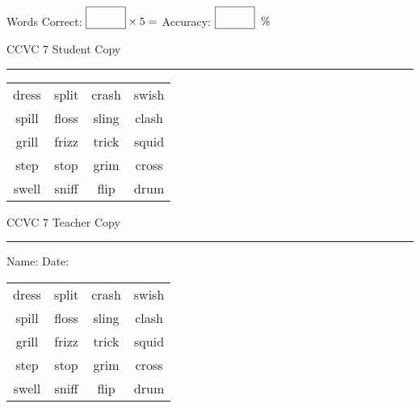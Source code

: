 \documentclass{memoir}
\begin{document}
\normalsize

Words Correct: $\fbox{\phantom{\huge 100}} \times 5 = $ Accuracy: $\fbox{\phantom{\huge 100}}\;\; \%$ 

\vfill

\newpage


\footnotesize \noindent
CCVC 7 \hfill Student Copy
\smallskip
\hrule

\Large

\setlength{\tabcolsep}{14pt}
\def\arraystretch{3}

{\selectfont


\begin{vplace}[0.5]
\begin{center}
\begin{tabular}{cccc}
dress & split & crash & swish \\
spill & floss & sling & clash            \\
grill            & frizz & trick & squid \\
step & stop & grim       & cross \\
swell & sniff & flip & drum \\
\end{tabular}
\end{center}
\end{vplace}

}

\newpage

\footnotesize \noindent
CCVC 7 \hfill Teacher Copy
\smallskip
\hrule

\normalsize

\vfill

\noindent
Name: \underline{\hspace{1.75in}} \hfill Date: \underline{\hspace{1in}}

\Large

{\selectfont


\begin{vplace}[0.5]
\begin{center}
\begin{tabular}{cccc}
dress & split & crash & swish \\
spill & floss & sling & clash            \\
grill            & frizz & trick & squid \\
step & stop & grim       & cross \\
swell & sniff & flip & drum \\
\end{tabular}
\end{center}
\end{vplace}



}
\end{document}

